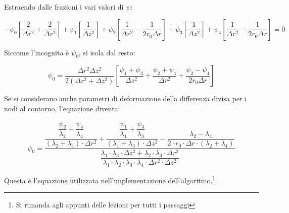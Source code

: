 \documentclass{tufte-handout}
\begin{document}
Estraendo dalle frazioni i vari valori di $\psi$:
\begin{fullwidth}
    \begin{equation*}
        -\psi_0\left[\frac{2}{\Delta r^2}+\frac{2}{\Delta r^2}\right]
        +\psi_1\left[\frac{1}{\Delta z^2}\right]
        +\psi_2\left[\frac{1}{\Delta r^2}-\frac{1}{2 r_0 \Delta r }\right]
        +\psi_3\left[\frac{1}{\Delta z^2}\right]
        +\psi_4\left[\frac{1}{\Delta r^2}-\frac{1}{2 r_0 \Delta r }\right]
        =0
    \end{equation*}
\end{fullwidth}

Siccome l'incognita è $\psi_0$, si isola dal resto:
\begin{fullwidth}
    \begin{equation}
        \psi_0 
        =
        \frac{\Delta r^2 \Delta z^2}{2(\Delta r^2 + \Delta z^2)}
        \left[
        \frac{\psi_1+\psi_3}{\Delta z^2}
        +\frac{\psi_2+\psi_4}{\Delta r^2}
        +\frac{\psi_2-\psi_4}{2 r_0 \Delta r}
        \right]
    \end{equation}
\end{fullwidth}

Se si considerano anche parametri di deformazione della differenza divisa per i nodi al contorno, l'equazione diventa:

\begin{fullwidth}
    \begin{equation}
        \psi_0 =
        \dfrac{
            \dfrac{
                \dfrac{\psi_2}{\lambda_2}
                +
                \dfrac{\psi_4}{\lambda_4}
            }
            {(\lambda_2+\lambda_4)\cdot \Delta r^2}
            +
            \dfrac{
                \dfrac{\psi_1}{\lambda_1}
                +
                \dfrac{\psi_3}{\lambda_3}
            }
            {(\lambda_1+\lambda_3)\cdot \Delta z^2}
            -
            \dfrac{
                \lambda_2 - \lambda_4
            }
            {
                2\cdot r_0 \cdot \Delta r \cdot (\lambda_2+\lambda_4)
            }
        }{
        \dfrac{
            \lambda_1 \cdot \lambda_3 \cdot \Delta z^2 +
            \lambda_2 \cdot \lambda_4 \cdot \Delta r^2
        }{
            \lambda_1 \cdot \lambda_2 \cdot \lambda_3 \cdot \lambda_4 \cdot \Delta r^2 \cdot \Delta z^2
        }
        }
    \end{equation}
\end{fullwidth}

Questa è l'equazione utilizzata nell'implementazione dell'algoritmo.\footnote{Si rimanda agli appunti delle lezioni per tutti i passaggi}
\end{document}
